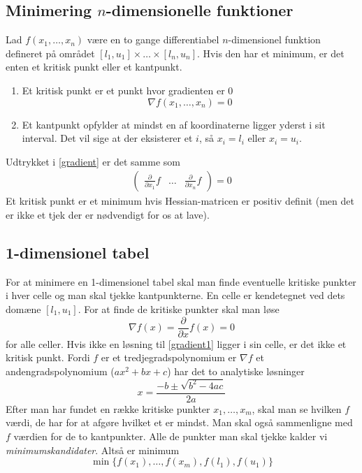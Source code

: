 \documentclass[a4paper, 12pt]{memoir}
\begin{document}
\subsection{Minimering $n$-dimensionelle funktioner}

Lad $f(x_1, \dots, x_n)$ være en to gange differentiabel $n$-dimensionel funktion defineret på området $[l_{1}, u_{1}]\times \dots \times [l_{n},u_n]$. Hvis den har et minimum, er det enten et kritisk punkt eller et kantpunkt.
\begin{enumerate}
\item
Et kritisk punkt er et punkt hvor gradienten er 0
\begin{equation}
\nabla f(x_1, \dots, x_n)=0\label{gradient}
\end{equation}
\item
Et kantpunkt opfylder at mindst en af koordinaterne ligger yderst i sit interval. Det vil sige at der eksisterer et $i$, så $x_i=l_i$ eller $x_i=u_i$.
\end{enumerate}
Udtrykket i \eqref{gradient} er det samme som
\begin{align}
\begin{pmatrix}
\frac{\partial}{\partial x_1}f & \dots & \frac{\partial }{\partial x_n}f
\end{pmatrix}=0
\end{align}
Et kritisk punkt er et minimum hvis Hessian-matricen er positiv definit (men det er ikke et tjek der er nødvendigt for os at lave).

\subsection{1-dimensionel tabel}
For at minimere en 1-dimensionel tabel skal man finde eventuelle kritiske punkter i hver celle og man skal tjekke kantpunkterne. En celle er kendetegnet ved dets domæne $[l_1,u_1]$. For at finde de kritiske punkter skal man løse
\begin{equation}
\nabla f(x)=\frac{\partial}{\partial x} f(x)=0 \label{gradient1}
\end{equation}
for alle celler. Hvis ikke en løsning til \eqref{gradient1} ligger i sin celle, er det ikke et kritisk punkt. Fordi $f$ er et tredjegradspolynomium er $\nabla f$ et andengradspolynomium ($ax^2+bx+c$) har det to analytiske løsninger
\begin{equation}
x=\frac{-b\pm\sqrt{b^2-4ac}}{2a}
\end{equation}
Efter man har fundet en række kritiske punkter $x_1,\dots, x_m$, skal man se hvilken $f$ værdi, de har for at afgøre hvilket et er mindst. Man skal også sammenligne med $f$ værdien for de to kantpunkter. Alle de punkter man skal tjekke kalder vi \emph{minimumskandidater}. Altså er minimum
\begin{equation}
\min \{f(x_1), \dots, f(x_m), f(l_1), f(u_1)\}
\end{equation}
\end{document}
